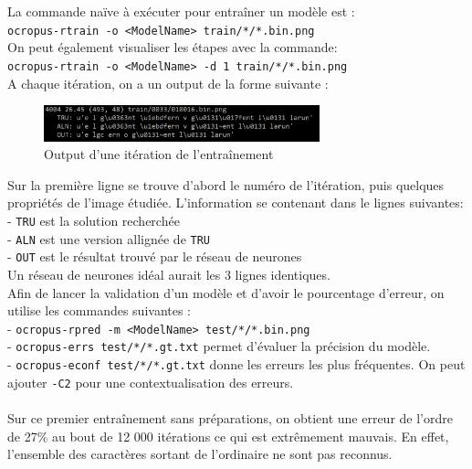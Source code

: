 \documentclass{article}
\begin{document}
La commande naïve à exécuter pour entraîner un modèle est : \\
\texttt{ocropus-rtrain -o <ModelName> train/*/*.bin.png} \\
On peut également visualiser les étapes avec la commande: \\
\texttt{ocropus-rtrain -o <ModelName> -d 1 train/*/*.bin.png} \\

\noindent A chaque itération, on a un output de la forme suivante : 

\begin{figure}[!h] 
    \center
    \includegraphics[width=8cm]{screen_output.png}
    \caption{Output d'une itération de l'entraînement}
    \label{API}
\end{figure}

Sur la première ligne se trouve d'abord le numéro de l'itération, puis quelques propriétés de l'image étudiée. L'information se contenant dans le lignes suivantes: \\
- \texttt{TRU} est la solution recherchée \\
- \texttt{ALN} est une version allignée de \texttt{TRU} \\
- \texttt{OUT} est le résultat trouvé par le réseau de neurones \\
Un réseau de neurones idéal aurait les 3 lignes identiques. \\

Afin de lancer la validation d'un modèle et d'avoir le pourcentage d'erreur, on utilise les commandes suivantes : \\
- \texttt{ocropus-rpred -m <ModelName> test/*/*.bin.png} \\
- \texttt{ocropus-errs test/*/*.gt.txt} permet d'évaluer la précision du modèle. \\
- \texttt{ocropus-econf test/*/*.gt.txt} donne les erreurs les plus fréquentes.
On peut ajouter \texttt{-C2} pour une contextualisation des erreurs. \\
\\
Sur ce premier entraînement sans préparations, on obtient une erreur de l'ordre de 27\% au bout de 12 000 itérations ce qui est extrêmement mauvais. En effet, l'ensemble des caractères sortant de l'ordinaire ne sont pas reconnus.
\end{document}
